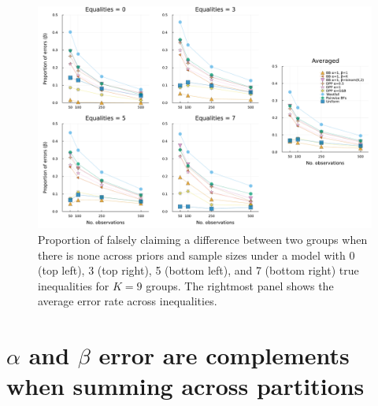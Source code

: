 \documentclass[11pt,a4paper]{article}
\theoremstyle{definition} %
\theoremstyle{case}
\begin{document}
\begin{figure}[!h]
    \centering
    \includegraphics[width=1\textwidth]{subset_k_9_beta.pdf}
    \caption{Proportion of falsely claiming a difference between two groups when there is none across priors and sample sizes under a model with 0 (top left), 3 (top right), 5 (bottom left), and 7 (bottom right) true inequalities for $K = 9$ groups. The rightmost panel shows the average error rate across inequalities.}
    \label{fig:big_simulation-k9-II}
\end{figure}

\iffalse
\section{$\alpha$ and $\beta$ error are complements when summing across partitions} \label{ap:complements}
\end{document}
